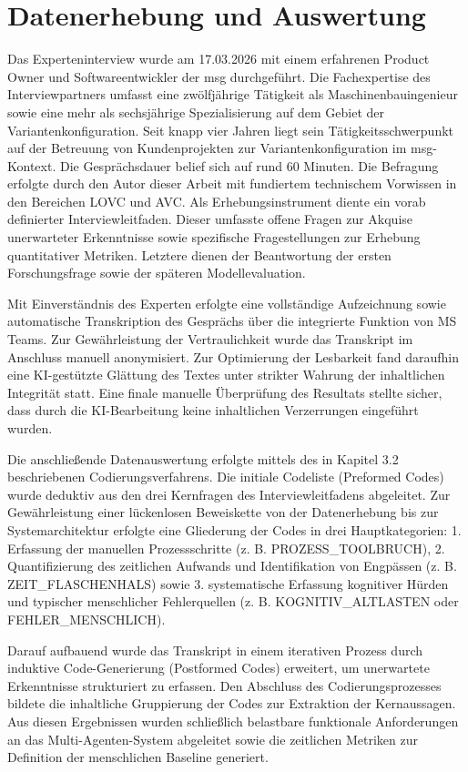 \section{Datenerhebung und Auswertung}
\label{sec:datenerhebung}
Das Experteninterview wurde am 17.03.2026 mit einem erfahrenen Product Owner und Softwareentwickler der msg durchgeführt. Die Fachexpertise des Interviewpartners umfasst eine zwölfjährige Tätigkeit als Maschinenbauingenieur sowie eine mehr als sechsjährige Spezialisierung auf dem Gebiet der Variantenkonfiguration. Seit knapp vier Jahren liegt sein Tätigkeitsschwerpunkt auf der Betreuung von Kundenprojekten zur Variantenkonfiguration im msg-Kontext. Die Gesprächsdauer belief sich auf rund 60 Minuten. Die Befragung erfolgte durch den Autor dieser Arbeit mit fundiertem technischem Vorwissen in den Bereichen LOVC und AVC. Als Erhebungsinstrument diente ein vorab definierter Interviewleitfaden. Dieser umfasste offene Fragen zur Akquise unerwarteter Erkenntnisse sowie spezifische Fragestellungen zur Erhebung quantitativer Metriken. Letztere dienen der Beantwortung der ersten Forschungsfrage sowie der späteren Modellevaluation.

Mit Einverständnis des Experten erfolgte eine vollständige Aufzeichnung sowie automatische Transkription des Gesprächs über die integrierte Funktion von MS Teams. Zur Gewährleistung der Vertraulichkeit wurde das Transkript im Anschluss manuell anonymisiert. Zur Optimierung der Lesbarkeit fand daraufhin eine KI-gestützte Glättung des Textes unter strikter Wahrung der inhaltlichen Integrität statt. Eine finale manuelle Überprüfung des Resultats stellte sicher, dass durch die KI-Bearbeitung keine inhaltlichen Verzerrungen eingeführt wurden.

Die anschließende Datenauswertung erfolgte mittels des in Kapitel 3.2 beschriebenen Codierungsverfahrens. Die initiale Codeliste (Preformed Codes) wurde deduktiv aus den drei Kernfragen des Interviewleitfadens abgeleitet. Zur Gewährleistung einer lückenlosen Beweiskette von der Datenerhebung bis zur Systemarchitektur erfolgte eine Gliederung der Codes in drei Hauptkategorien: 1. Erfassung der manuellen Prozessschritte (z. B. PROZESS\_TOOLBRUCH), 2. Quantifizierung des zeitlichen Aufwands und Identifikation von Engpässen (z. B. ZEIT\_FLASCHENHALS) sowie 3. systematische Erfassung kognitiver Hürden und typischer menschlicher Fehlerquellen (z. B. KOGNITIV\_ALTLASTEN oder FEHLER\_MENSCHLICH).

Darauf aufbauend wurde das Transkript in einem iterativen Prozess durch induktive Code-Generierung (Postformed Codes) erweitert, um unerwartete Erkenntnisse strukturiert zu erfassen. Den Abschluss des Codierungsprozesses bildete die inhaltliche Gruppierung der Codes zur Extraktion der Kernaussagen. Aus diesen Ergebnissen wurden schließlich belastbare funktionale Anforderungen an das Multi-Agenten-System abgeleitet sowie die zeitlichen Metriken zur Definition der menschlichen Baseline generiert.

